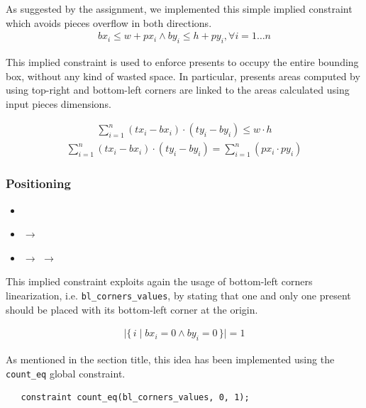 \documentclass[a4paper,10pt]{article}
\newcommand{\xmark}{\ding{55}}%
\newcounter{subsubsubsection}[subsubsection]
\begin{document}
As suggested by the assignment, we implemented this simple implied constraint which avoids pieces overflow in both directions.
\begin{gather*}
   bx_{i} \leq w + px_{i} \wedge by_{i} \leq h + py_{i}, \forall{i = 1 \dots n}
\end{gather*}

 \label{sec:areas-summation}
This implied constraint is used to enforce presents to occupy the entire bounding box, without any kind of wasted space.
In particular, presents areas computed by using top-right and bottom-left corners are linked to the areas calculated using input pieces dimensions.

\begin{gather*}
   \sum_{i=1}^{n} (tx_{i} - bx_{i}) \cdot (ty_{i} - by_{i}) \leq w \cdot h
\end{gather*}
\begin{gather*}
   \sum_{i=1}^{n} (tx_{i} - bx_{i}) \cdot (ty_{i} - by_{i}) = \sum_{i=1}^{n} (px_{i} \cdot py_{i})
\end{gather*}

\subsubsection{Positioning}
\begin{itemize}
   \item {}
   \item {} $\rightarrow$ \xmark
   \item {} $\rightarrow$ $\rightarrow$ \xmark
\end{itemize}

 \label{sec:present-at-origin}
This implied constraint exploits again the usage of bottom-left corners linearization, i.e. \texttt{bl\_corners\_values},
by stating that one and only one present should be placed with its bottom-left corner at the origin.

\begin{gather*}
   \lvert\{\,i \mid bx_{i} = 0 \wedge by_{i} = 0\,\}\rvert = 1
\end{gather*}

As mentioned in the section title, this idea has been implemented using the \texttt{count\_eq} global constraint.

\begin{verbatim}
   constraint count_eq(bl_corners_values, 0, 1);
\end{verbatim}
\end{document}
